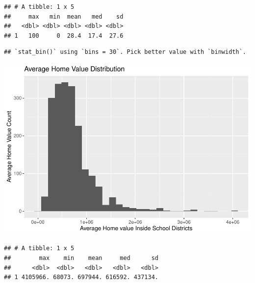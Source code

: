 \documentclass[
]{article}
\begin{document}
\begin{verbatim}
## # A tibble: 1 x 5
##     max   min  mean   med    sd
##   <dbl> <dbl> <dbl> <dbl> <dbl>
## 1   100     0  28.4  17.4  27.6
\end{verbatim}

\begin{verbatim}
## `stat_bin()` using `bins = 30`. Pick better value with `binwidth`.
\end{verbatim}

\includegraphics{final-writeup_files/figure-latex/unnamed-chunk-3-2.pdf}

\begin{verbatim}
## # A tibble: 1 x 5
##        max    min    mean     med      sd
##      <dbl>  <dbl>   <dbl>   <dbl>   <dbl>
## 1 4105966. 68073. 697944. 616592. 437134.
\end{verbatim}
\end{document}
